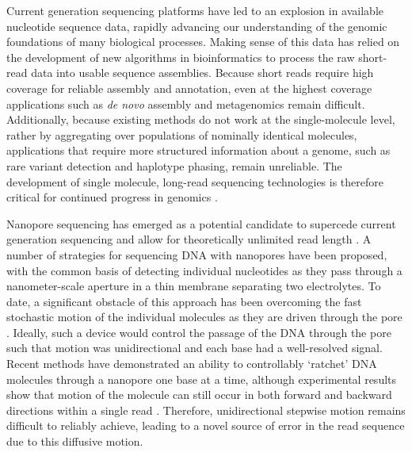 \documentclass{biophys_letter}
\begin{document}
Current generation sequencing platforms have led to an explosion in available nucleotide sequence data, rapidly advancing our understanding of the genomic foundations of many biological processes.
Making sense of this data has relied on the development of new algorithms in bioinformatics to process the raw short-read data into usable sequence assemblies.
Because short reads require high coverage for reliable assembly and annotation, even at the highest coverage applications such as {\it de novo} assembly and metagenomics remain difficult.
Additionally, because existing methods do not work at the single-molecule level, rather by aggregating over populations of nominally identical molecules, applications that require more structured information about a genome, such as rare variant detection and haplotype phasing, remain unreliable.
The development of single molecule, long-read sequencing technologies is therefore critical for continued progress in genomics \cite{Mak:2012}.

Nanopore sequencing has emerged as a potential candidate to supercede current generation sequencing and allow for theoretically unlimited read length \cite{Branton:2008}.
A number of strategies for sequencing DNA with nanopores have been proposed, with the common basis of detecting individual nucleotides as they pass through a nanometer-scale aperture in a thin membrane separating two electrolytes.
To date, a significant obstacle of this approach has been overcoming the fast stochastic motion of the individual molecules as they are driven through the pore \cite{Venkatesan:2011, Lu:2011}.
Ideally, such a device would control the passage of the DNA through the pore such that motion was unidirectional and each base had a well-resolved signal.
Recent methods have demonstrated an ability to controllably `ratchet' DNA molecules through a nanopore one base at a time, although experimental results show that motion of the molecule can still occur in both forward and backward directions within a single read \cite{Luan:2011, Olasagasti:2010, Cherf:2012}.
Therefore, unidirectional stepwise motion remains difficult to reliably achieve, leading to a novel source of error in the read sequence due to this diffusive motion.
\end{document}
